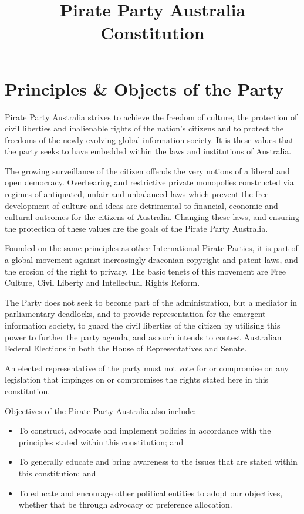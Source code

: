 \documentclass[a4paper,titlepage,8.5pt]{article}
\title{Pirate Party Australia Constitution}
\begin{document}
\tableofcontents
\thispagestyle{empty}
\newpage

\setcounter{page}{1}

\part{Principles \& Objects of the Party}
Pirate Party Australia strives to achieve the freedom of culture, the protection of civil liberties and inalienable rights of the nation’s citizens and to protect the freedoms of the newly evolving global information society. It is these values that the party seeks to have embedded within the laws and institutions of Australia.

The growing surveillance of the citizen offends the very notions of a liberal and open democracy. Overbearing and restrictive private monopolies constructed via regimes of antiquated, unfair and unbalanced laws which prevent the free development of culture and ideas are detrimental to financial, economic and cultural outcomes for the citizens of Australia. Changing these laws, and ensuring the protection of these values are the goals of the Pirate Party Australia. 

Founded on the same principles as other International Pirate Parties, it is part of a global movement against increasingly draconian copyright and patent laws, and the erosion of the right to privacy. The basic tenets of this movement are Free Culture, Civil Liberty and Intellectual Rights Reform.

The Party does not seek to become part of the administration, but a mediator in parliamentary deadlocks, and to provide representation for the emergent information society, to guard the civil liberties of the citizen by utilising this power to further the party agenda, and as such intends to contest Australian Federal Elections in both the House of Representatives and Senate.

An elected representative of the party must not vote for or compromise on any legislation that impinges on or compromises the rights stated here in this constitution.


Objectives of the Pirate Party Australia also include:
\begin{itemize}
\item To construct, advocate and implement policies in accordance with the principles stated within this constitution; and
\item To generally educate and bring awareness to the issues that are stated within this constitution; and
\item To educate and encourage other political entities to adopt our objectives, whether that be through advocacy or preference allocation.
\end{itemize}
\end{document}

